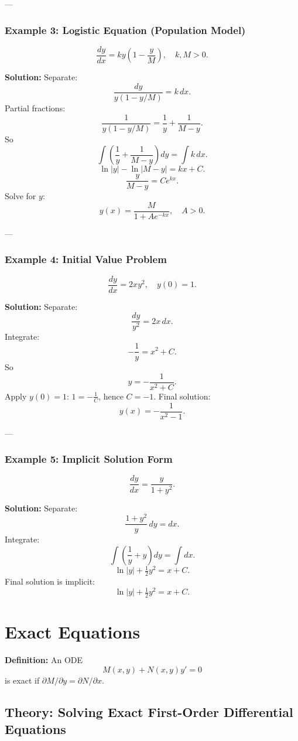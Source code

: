 \documentclass[12pt]{book}
\begin{document}
---

\subsection*{Example 3: Logistic Equation (Population Model)}
\[
\frac{dy}{dx} = ky\!\left(1 - \frac{y}{M}\right), \quad k,M>0.
\]

\textbf{Solution:} Separate:
\[
\frac{dy}{y(1-y/M)} = k\,dx.
\]
Partial fractions:
\[
\frac{1}{y(1-y/M)} = \frac{1}{y} + \frac{1}{M-y}.
\]
So
\[
\int \left(\frac{1}{y} + \frac{1}{M-y}\right)dy = \int k\,dx.
\]
\[
\ln|y| - \ln|M-y| = kx + C.
\]
\[
\frac{y}{M-y} = C e^{kx}.
\]
Solve for $y$:
\[
y(x) = \frac{M}{1 + A e^{-kx}}, \quad A>0.
\]

---

\subsection*{Example 4: Initial Value Problem}
\[
\frac{dy}{dx} = 2x y^2, \quad y(0) = 1.
\]

\textbf{Solution:} Separate:
\[
\frac{dy}{y^2} = 2x\,dx.
\]
Integrate:
\[
- \frac{1}{y} = x^2 + C.
\]
So
\[
y = -\frac{1}{x^2 + C}.
\]
Apply $y(0)=1$: $1 = -\tfrac{1}{C}$, hence $C=-1$.  
Final solution:
\[
y(x) = -\frac{1}{x^2 - 1}.
\]

---

\subsection*{Example 5: Implicit Solution Form}
\[
\frac{dy}{dx} = \frac{y}{1+y^2}.
\]

\textbf{Solution:} Separate:
\[
\frac{1+y^2}{y}\,dy = dx.
\]
Integrate:
\[
\int \left(\frac{1}{y} + y\right)dy = \int dx.
\]
\[
\ln|y| + \tfrac{1}{2}y^2 = x + C.
\]
Final solution is implicit:
\[
\ln|y| + \tfrac{1}{2}y^2 = x + C.
\]


\chapter{Exact Equations}
\textbf{Definition:} An ODE
\[
M(x,y) + N(x,y)y' = 0
\]
is exact if \(\partial M/\partial y = \partial N/\partial x\).

\section*{Theory: Solving Exact First-Order Differential Equations}
\end{document}
